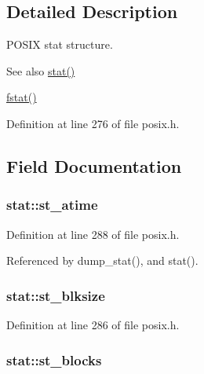 \subsection{Detailed Description}
P\+O\+S\+IX stat structure. 

\begin{DoxySeeAlso}{See also}
\hyperlink{posix_8c_abef70bf7a4af8a1f4998db0035c51781}{stat()} 

\hyperlink{posix_8h_a85e86e70773c0a204346f965272bd364}{fstat()} 
\end{DoxySeeAlso}


Definition at line 276 of file posix.\+h.



\subsection{Field Documentation}
\subsubsection[{\texorpdfstring{st\+\_\+atime}{st_atime}}]{ stat\+::st\+\_\+atime}\hypertarget{structstat_ab74d1e7e345e88b9d0fb2688a97cba64}{}\label{structstat_ab74d1e7e345e88b9d0fb2688a97cba64}


Definition at line 288 of file posix.\+h.



Referenced by dump\+\_\+stat(), and stat().

\subsubsection[{\texorpdfstring{st\+\_\+blksize}{st_blksize}}]{ stat\+::st\+\_\+blksize}\hypertarget{structstat_a38d474e1ae3cf6fbdde89ac3c3e308f1}{}\label{structstat_a38d474e1ae3cf6fbdde89ac3c3e308f1}


Definition at line 286 of file posix.\+h.

\subsubsection[{\texorpdfstring{st\+\_\+blocks}{st_blocks}}]{ stat\+::st\+\_\+blocks}\hypertarget{structstat_a42dd716b2f9234f961d949fc9500eefb}{}\label{structstat_a42dd716b2f9234f961d949fc9500eefb}


